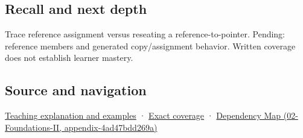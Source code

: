 \subsection{Recall and next depth}\label{recall-and-next-depth}

Trace reference assignment versus reseating a reference-to-pointer. Pending: reference members and generated copy/assignment behavior. Written coverage does not establish learner mastery.

\subsection{Source and navigation}\label{source-and-navigation}

\href{Continuous\%20Notes/Computing\%20Foundations\%20-\%20From\%20Bits\%20to\%20C++\%20and\%20Systems\%20APIs\#Giving\%20another\%20name\%20to\%20a\%20live\%20object}{Teaching explanation and examples} · \hyperref[appendix-fd090d982a15]{Exact coverage} · \href{}{Dependency Map (02-Foundations-II, appendix-4ad47bdd269a)}
